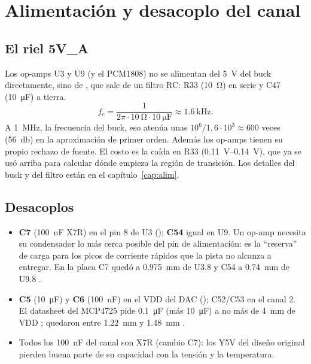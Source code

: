 \section{Alimentación y desacoplo del canal}\label{sec:c03-alim}

\subsection{El riel 5V\_A}

Los op-amps U3 y U9 (y el PCM1808) no se alimentan del \SI{5}{\volt} del buck directamente, sino de , que
sale de un filtro RC: R33 (\SI{10}{\ohm}) en serie y C47 (\SI{10}{\micro\farad}) a tierra.
\begin{equation*}
  f_c = \frac{1}{2\pi\cdot\SI{10}{\ohm}\cdot\SI{10}{\micro\farad}} \approx \SI{1.6}{\kilo\hertz}.
\end{equation*}
A \SI{1}{\mega\hertz}, la frecuencia del buck, eso atenúa unas $10^6/1{,}6\cdot10^3 \approx 600$ veces
(\SI{56}{\decibel}) en la aproximación de primer orden. Además los op-amps tienen su propio rechazo de fuente. El costo
es la caída en R33 (\SIrange{0.11}{0.14}{\volt}), que ya se usó arriba para calcular dónde empieza la región de
transición. Los detalles del buck y del filtro están en el capítulo~\ref{cap:alim}.

\subsection{Desacoplos}

\begin{itemize}
  \item \textbf{C7} (\SI{100}{\nano\farad} X7R) en el pin 8 de U3 (); \textbf{C54} igual en U9. Un op-amp
        necesita su condensador lo más cerca posible del pin de alimentación: es la ``reserva'' de carga para los
        picos de corriente rápidos que la pista no alcanza a entregar. En la placa C7 quedó a \SI{0.975}{\milli\meter}
        de U3.8 y C54 a \SI{0.74}{\milli\meter} de U9.8 \medido.
  \item \textbf{C5} (\SI{10}{\micro\farad}) y \textbf{C6} (\SI{100}{\nano\farad}) en el VDD del DAC ();
        C52/C53 en el canal 2. El datasheet del MCP4725 pide \SI{0.1}{\micro\farad} (más \SI{10}{\micro\farad}) a no
        más de \SI{4}{\milli\meter} de VDD ; quedaron entre \SI{1.22}{\milli\meter} y
        \SI{1.48}{\milli\meter} \medido.
  \item Todos los \SI{100}{\nano\farad} del canal son X7R (cambio C7): los Y5V del diseño original pierden buena parte
        de su capacidad con la tensión y la temperatura.
\end{itemize}

